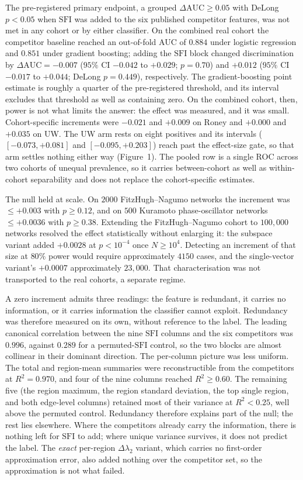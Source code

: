 \documentclass[11pt]{article}
\newcommand{\lam}{\lambda}
\newcommand{\SFI}{\ensuremath{\mathrm{SFI}}}
\newcommand{\dAUC}{\ensuremath{\Delta\mathrm{AUC}}}
\begin{document}
The pre-registered primary endpoint, a grouped $\dAUC\geq0.05$ with DeLong
$p<0.05$ when \SFI{} was added to the six published competitor features, was
not met in any cohort or by either classifier. On the combined real
cohort the competitor baseline reached an out-of-fold AUC of $0.884$ under
logistic regression and $0.851$ under gradient boosting; adding the \SFI{} block
changed discrimination by $\dAUC=-0.007$ ($95\%$ CI $-0.042$ to $+0.029$;
$p=0.70$) and $+0.012$ ($95\%$ CI $-0.017$ to $+0.044$; DeLong $p=0.449$),
respectively. The gradient-boosting point estimate is roughly a quarter of the
pre-registered threshold, and its interval excludes that threshold as well as
containing zero. On the combined cohort, then, power is not what limits the
answer: the effect was measured, and it was small. Cohort-specific increments
were $-0.021$ and $+0.009$ on Roney and $+0.000$ and $+0.035$ on UW. The UW arm
rests on eight positives and its intervals ($[-0.073,+0.081]$ and
$[-0.095,+0.203]$) reach past the effect-size gate, so that arm settles nothing
either way (Figure~1). The pooled row is a single ROC across two cohorts of
unequal prevalence, so it carries between-cohort as well as within-cohort
separability and does not replace the cohort-specific estimates.

The null held at scale. On $2000$ FitzHugh--Nagumo networks the increment was
$\leq+0.003$ with $p\geq0.12$, and on $500$ Kuramoto phase-oscillator networks
$\leq+0.0036$ with $p\geq0.38$. Extending the FitzHugh--Nagumo cohort to
$100{,}000$ networks resolved the effect statistically without enlarging it: the
subspace variant added $+0.0028$ at $p<10^{-4}$ once $N\geq10^{4}$. Detecting an
increment of that size at $80\%$ power would require approximately $4150$
cases, and the single-vector variant's $+0.0007$ approximately $23{,}000$. That
characterisation was not transported to the real cohorts, a separate regime.

A zero increment admits three readings: the feature is redundant, it carries no
information, or it carries information the classifier cannot exploit. Redundancy
was therefore measured on its own, without reference to the label. The leading canonical
correlation between the nine \SFI{} columns and the six competitors was $0.996$,
against $0.289$ for a permuted-\SFI{} control, so the two blocks are almost
collinear in their dominant direction. The per-column picture was less uniform.
The total and region-mean summaries were reconstructible from the competitors at
$R^{2}=0.970$, and four of the nine columns reached $R^{2}\geq0.60$. The
remaining five (the region maximum, the region standard deviation, the top
single region, and both edge-level columns) retained most of their variance at
$R^{2}<0.25$, well above the permuted control. Redundancy therefore explains
part of the null; the rest lies elsewhere. Where the competitors already carry
the information, there is nothing left for \SFI{} to add; where unique variance
survives, it does not predict the label. The \emph{exact} per-region
$\Delta\lam_2$ variant, which carries no first-order approximation error, also
added nothing over the competitor set, so the approximation is not what failed.
\end{document}

